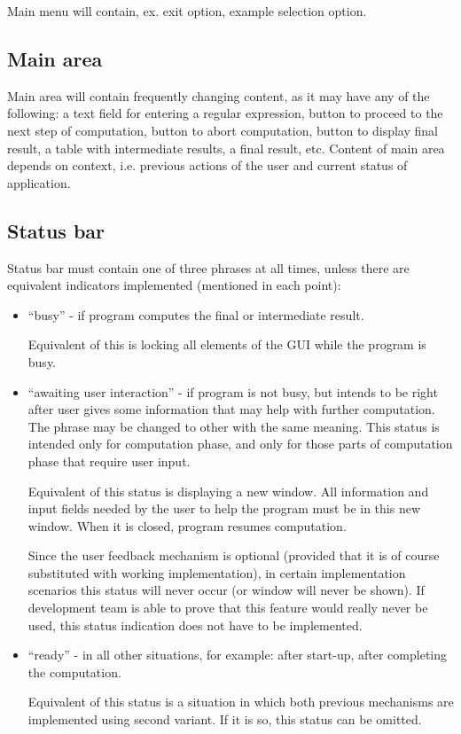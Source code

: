 \documentclass{article}
\begin{document}
Main menu will contain, ex. exit option, %
example selection option.

\subsection{Main area}
Main area will contain frequently changing content, as it may have any of the following: a text
field for entering a regular expression, button to proceed to the next step of computation, button
to abort computation, button to display final result, a table with intermediate results, a final
result, etc. Content of main area depends on context, i.e. previous actions of the user and current
status of application.

\subsection{Status bar}
Status bar must contain one of three phrases at all times, unless there are equivalent indicators
implemented (mentioned in each point):
\begin{itemize}

  \item ``busy'' - if program computes the final or intermediate result. %
  
  Equivalent of this is locking all elements of the GUI while the program is busy.

  \item ``awaiting user interaction'' - if program is not busy, but intends to be right after user
  gives some information that may help with further computation. The phrase may be changed to other
  with the same meaning. This status is intended only for computation phase, and only for those
  parts of computation phase that require user input.
  
  Equivalent of this status is displaying a new window. All information and input fields needed by
  the user to help the program must be in this new window. When it is closed, program resumes
  computation.
  
  Since the user feedback mechanism is optional (provided that it is of course substituted with
  working implementation), in certain implementation scenarios this status will never occur (or
  window will never be shown). If development team is able to prove that this feature would really
  never be used, this status indication does not have to be implemented.

  \item ``ready'' - in all other situations, for example: after start-up, %
  after completing the computation.
  
  Equivalent of this status is a situation in which both previous mechanisms are implemented using
  second variant. If it is so, this status can be omitted.

\end{itemize}
\end{document}
